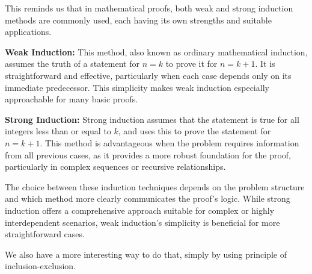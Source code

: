             \begin{remark}
                This reminds us that in mathematical proofs, both weak and strong induction methods are commonly used, each having its own strengths and suitable applications. 
                
                \textbf{Weak Induction:} This method, also known as ordinary mathematical induction, assumes the truth of a statement for \(n=k\) to prove it for \(n=k+1\). It is straightforward and effective, particularly when each case depends only on its immediate predecessor. This simplicity makes weak induction especially approachable for many basic proofs.
                
                \textbf{Strong Induction:} Strong induction assumes that the statement is true for all integers less than or equal to \(k\), and uses this to prove the statement for \(n=k+1\). This method is advantageous when the problem requires information from all previous cases, as it provides a more robust foundation for the proof, particularly in complex sequences or recursive relationships.
                
                The choice between these induction techniques depends on the problem structure and which method more clearly communicates the proof's logic. While strong induction offers a comprehensive approach suitable for complex or highly interdependent scenarios, weak induction's simplicity is beneficial for more straightforward cases.
                \end{remark}
        We also have a more interesting way to do that, simply by using principle of inclusion-exclusion.
